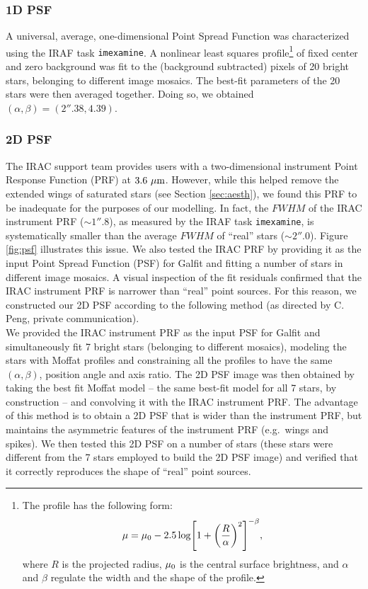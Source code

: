\documentclass[preprint2]{emulateapj}
\begin{document}
\subsubsection{1D PSF}
A universal, average, one-dimensional Point Spread Function was characterized using the IRAF task {\tt imexamine}.
A nonlinear least squares \citep{moffat1969} profile\footnote{The \citep{moffat1969} profile 
has the following form:
\begin{equation}
\mu = \mu_{\rm 0} - 2.5 \log \Biggl[ 1 + \biggl( \frac{R}{\alpha} \biggr)^2 \Biggr]^{-\beta} ,
\end{equation}
where $R$ is the projected radius, $\mu_{\rm 0}$ is the central surface brightness, and 
$\alpha$ and $\beta$ regulate the width and the shape of the profile.} 
of fixed center and zero background was fit to the 
(background subtracted) pixels of 20 bright stars, belonging to different image mosaics.
The best-fit parameters of the 20 stars were then averaged together. 
Doing so, we obtained 
$(\alpha, \beta) = (2''.38, 4.39)$.

\subsubsection{2D PSF}
The IRAC support team provides users with a two-dimensional instrument Point Response Function (PRF) at $3.6~\rm \mu m$.
However, while this helped remove the extended wings of saturated stars (see Section \ref{sec:aesth}), 
we found this PRF to be inadequate for the purposes of our modelling.
In fact, the $FWHM$ of the IRAC instrument PRF ($\sim 1''.8$), as measured by the IRAF task {\tt imexamine}, 
is systematically smaller than the average $FWHM$ of ``real'' stars ($\sim 2''.0$). 
Figure \ref{fig:psf} illustrates this issue.
We also tested the IRAC PRF by providing it as the input Point Spread Function (PSF) for Galfit 
and fitting a number of stars in different image mosaics.
A visual inspection of the fit residuals confirmed that the IRAC instrument PRF is narrower than ``real'' point sources.
For this reason, we constructed our 2D PSF according to the following method 
(as directed by C. Peng, private communication).\\
We provided the IRAC instrument PRF as the input PSF for Galfit 
and simultaneously fit 7 bright stars (belonging to different mosaics), 
modeling the stars with Moffat profiles 
and constraining all the profiles to have the same $(\alpha, \beta)$, position angle and axis ratio.
The 2D PSF image was then obtained by taking the best fit Moffat model -- the same best-fit model for all 7 stars, by construction -- 
and convolving it with the IRAC instrument PRF.
The advantage of this method is to obtain a 2D PSF that is wider than the instrument PRF, 
but maintains the asymmetric features of the instrument PRF (e.g.~wings and spikes).
We then tested this 2D PSF 
on a number of stars (these stars were different from the 7 stars employed to build the 2D PSF image)
and verified that it correctly reproduces the shape of ``real'' point sources. 
\end{document}
